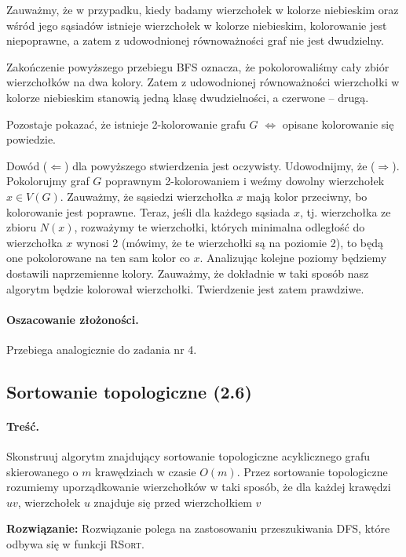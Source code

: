 Zauważmy, że w przypadku, kiedy badamy wierzchołek w kolorze niebieskim oraz wśród jego sąsiadów
istnieje wierzchołek w kolorze niebieskim, kolorowanie jest niepoprawne, a zatem z udowodnionej 
równoważności graf nie jest dwudzielny.

Zakończenie powyższego przebiegu BFS oznacza, że pokolorowaliśmy cały zbiór wierzchołków na
dwa kolory. Zatem z udowodnionej równoważności
wierzchołki w kolorze niebieskim stanowią jedną klasę dwudzielności, a czerwone -- drugą.

Pozostaje pokazać, że istnieje 2-kolorowanie grafu $G$ $\Leftrightarrow$ opisane kolorowanie się powiedzie. 

Dowód ($\Leftarrow$) dla powyższego stwierdzenia jest oczywisty. Udowodnijmy, że ($\Rightarrow$). Pokolorujmy graf $G$
poprawnym 2-kolorowaniem i weźmy dowolny wierzchołek $x \in V(G)$. Zauważmy, że sąsiedzi
wierzchołka $x$ mają kolor przeciwny, bo kolorowanie jest poprawne. Teraz, jeśli dla każdego
sąsiada $x$, tj. wierzchołka ze zbioru $N(x)$, rozważymy te wierzchołki, których minimalna odległość do wierzchołka 
$x$ wynosi 2 (mówimy, że te wierzchołki są na poziomie 2), to będą one pokolorowane na ten sam 
kolor co $x$. Analizując kolejne poziomy
będziemy dostawili naprzemienne kolory. Zauważmy, że dokładnie w taki sposób nasz algorytm
będzie kolorował wierzchołki. Twierdzenie jest zatem prawdziwe.

\paragraph{Oszacowanie złożoności.} Przebiega analogicznie do zadania nr 4.

\subsection{Sortowanie topologiczne (2.6)}
\label{zad:tsort}
\paragraph{Treść.} Skonstruuj algorytm znajdujący 
sortowanie topologiczne acyklicznego grafu skierowanego 
o $m$ krawędziach w czasie $O(m)$. 
Przez sortowanie topologiczne rozumiemy uporządkowanie 
wierzchołków w taki sposób, że dla
każdej krawędzi $uv$, wierzchołek $u$ znajduje się przed 
wierzchołkiem $v$

\textbf{Rozwiązanie:} Rozwiązanie polega na zastosowaniu przeszukiwania DFS, które
odbywa się w funkcji \textsc{RSort}.

